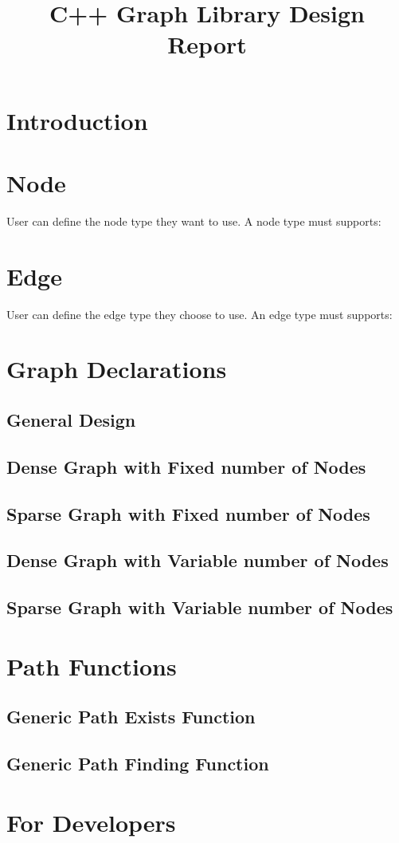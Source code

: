 \documentclass[]{article}
\title{C++ Graph Library Design Report}
\author{}
\begin{document}
\maketitle
\section{Introduction}

\section {Node}
User can define the node type they want to use. A node type must supports:

\section {Edge}
User can define the edge type they choose to use. An edge type must supports:

\section{Graph Declarations}
\subsection{General Design}
\subsection{Dense Graph with Fixed number of Nodes}
\subsection{Sparse Graph with Fixed number of Nodes}
\subsection{Dense Graph with Variable number of Nodes}
\subsection{Sparse Graph with Variable number of Nodes}

\section{Path Functions}
\subsection{Generic Path Exists Function}
\subsection{Generic Path Finding Function}

\section{For Developers}
\end{document}
